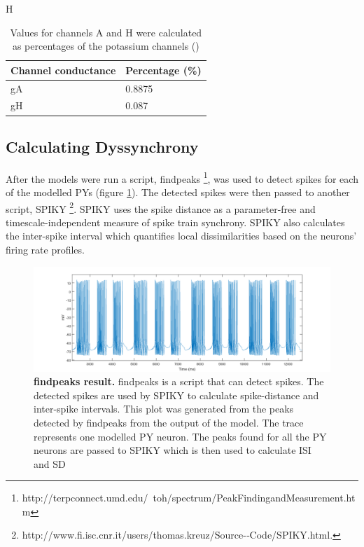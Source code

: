 \begin{table}{H}
	\centering
	\caption{Values for channels A and H were calculated as percentages of the potassium channels (\cite{Temporal2012})}
	{\renewcommand{\arraystretch}{2}%
	\begin{tabular}{l l}
		\hline
		\textbf{Channel conductance} & \textbf{Percentage (\%)} \\
		\hline
		gA & 0.8875 \\
		gH & 0.087 \\
		\hline
	\end{tabular}}
	\label{tab:percentages}
\end{table}

\subsection{Calculating Dyssynchrony}
\label{sec:dyssync}
After the models were run a \matlab script, findpeaks \footnote{http://terpconnect.umd.edu/~toh/spectrum/PeakFindingandMeasurement.htm}, was used to detect spikes for each of the modelled \acp{PY} (figure \ref{fig:findpeaks}). The detected spikes were then passed to another \matlab script, SPIKY \cite{Kreuz2013}\footnote{http://www.fi.isc.cnr.it/users/thomas.kreuz/Source-­‐Code/SPIKY.html.}. SPIKY uses the spike distance as a parameter-free and timescale-independent measure of spike train synchrony. SPIKY also calculates the inter-spike interval which quantifies local dissimilarities based on the neurons' firing rate profiles.  


\begin{figure}[H]
	\begin{center}
		\includegraphics[width=\columnwidth]{graphics/peakfinder.png}
		\caption[findpeaks result.]{\textbf{findpeaks result.} findpeaks is a \matlab script that can detect spikes. The detected spikes are used by SPIKY to calculate spike-distance and inter-spike intervals. This plot was generated from the peaks detected by findpeaks from the output of the \matlab model. The trace represents one modelled \ac{PY} neuron. The peaks found for all the \ac{PY} neurons are passed to SPIKY which is then used to calculate \ac{ISI} and \ac{SD}}
		\label{fig:findpeaks}
	\end{center}
\end{figure}


